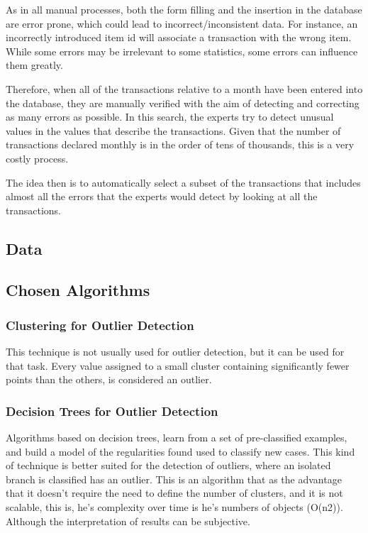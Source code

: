 \documentclass{llncs}
\begin{document}
As in all manual processes, both the form filling and the insertion in the database are error prone, which could lead to incorrect/inconsistent data. For instance, an incorrectly introduced item id will associate a transaction with the wrong item. While some errors may be irrelevant to some statistics, some errors can influence them greatly.

Therefore, when all of the transactions relative to a month have been entered into the database, they are manually verified with
the aim of detecting and correcting as many errors as possible. In this search, the experts try to detect unusual values in the values that describe the transactions.
Given that the number of transactions declared monthly is in the order of tens of thousands, this is a very costly process.

The idea then is to automatically select a subset of the
transactions that includes almost all the errors that the experts would detect by looking at all the transactions.

\subsection{Data}

\subsection{Chosen Algorithms}

\subsubsection{Clustering for Outlier Detection}

This technique is not usually used for outlier detection, but it can be used for that task.
Every value assigned to a small cluster containing significantly fewer points than the others, is considered an outlier.

\subsubsection{Decision Trees for Outlier Detection}

Algorithms based on decision trees, learn from a set of pre-classified examples, and build a model of the regularities found used to classify new cases.
This kind of technique is better suited for the detection of outliers, where an isolated branch is classified has an outlier.
This is an algorithm that as the advantage that it doesn't require the need to define the number of clusters, and it is not scalable, this is, he's complexity over time is he's numbers of objects (O(n2)). Although the interpretation of results can be subjective.

\begin{thebibliography}{9}

\end{thebibliography}
\end{document}
